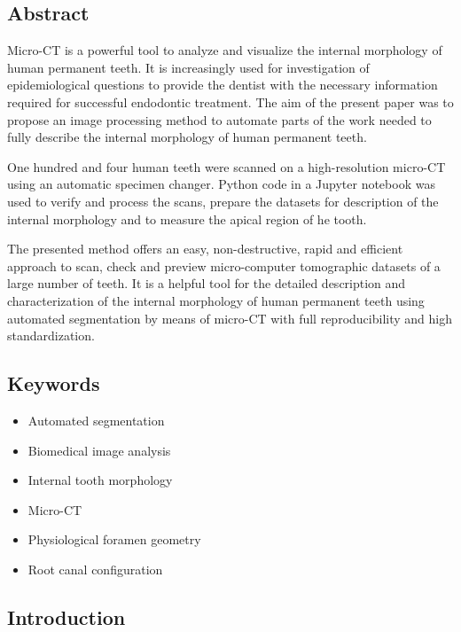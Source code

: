 \documentclass[
  american,
]{article}
\providecommand{\tightlist}{%
  \setlength{\itemsep}{0pt}\setlength{\parskip}{0pt}}
\begin{document}
\hypertarget{abstract}{%
\subsection{Abstract}\label{abstract}}

Micro-CT is a powerful tool to analyze and visualize the internal morphology of human permanent teeth.
It is increasingly used for investigation of epidemiological questions to provide the dentist with the necessary information required for successful endodontic treatment.
The aim of the present paper was to propose an image processing method to automate parts of the work needed to fully describe the internal morphology of human permanent teeth.

One hundred and four human teeth were scanned on a high-resolution micro-CT using an automatic specimen changer.
Python code in a Jupyter notebook was used to verify and process the scans, prepare the datasets for description of the internal morphology and to measure the apical region of he tooth.

The presented method offers an easy, non-destructive, rapid and efficient approach to scan, check and preview micro-computer tomographic datasets of a large number of teeth.
It is a helpful tool for the detailed description and characterization of the internal morphology of human permanent teeth using automated segmentation by means of micro-CT with full reproducibility and high standardization.

\hypertarget{keywords}{%
\subsection{Keywords}\label{keywords}}

\begin{itemize}
\tightlist
\item
  Automated segmentation
\item
  Biomedical image analysis
\item
  Internal tooth morphology
\item
  Micro-CT
\item
  Physiological foramen geometry
\item
  Root canal configuration
\end{itemize}

\hypertarget{introduction}{%
\subsection{Introduction}\label{introduction}}
\end{document}
